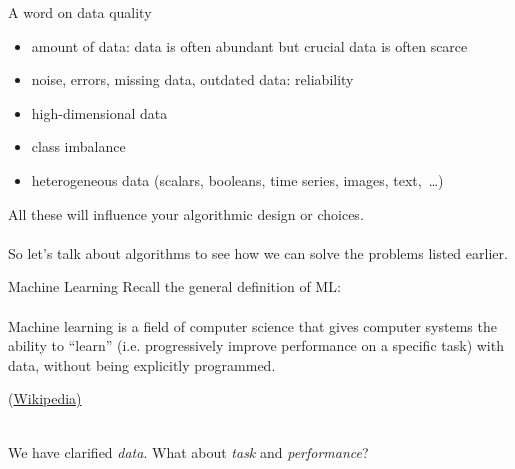 \documentclass[10pt,a4paper,t,aspectratio=1610,dvipsnames]{beamer}
\begin{document}
\begin{frame}{A word on data quality}
	\begin{itemize}
		\item amount of data: data is often abundant but crucial data is often scarce
		\item noise, errors, missing data, outdated data: reliability
		\item high-dimensional data
		\item class imbalance
		\item heterogeneous data (scalars, booleans, time series, images, text, \ldots)
	\end{itemize}
	All these will influence your algorithmic design or choices.\\
	~\\
	So let's talk about algorithms to see how we can solve the problems listed earlier.
\end{frame}

\begin{frame}{Machine Learning}
	\centering
	\vfill
	Recall the general definition of ML:\\
	~\\Machine learning is a field of computer science that gives computer systems the ability to ``learn'' (i.e. progressively improve performance on a specific task) with data, without being explicitly programmed.
	\begin{flushright}
		{\footnotesize (\href{https://en.wikipedia.org/wiki/Machine_learning}{Wikipedia)}}
	\end{flushright}
	~\\
	We have clarified \emph{data}.
	What about \emph{task} and \emph{performance}?
\end{frame}
\end{document}
